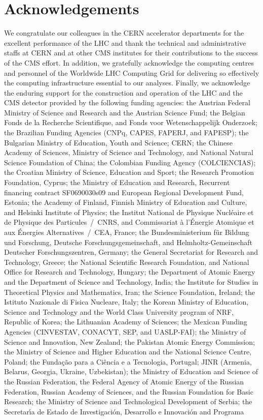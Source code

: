 \documentclass[12pt,twoside,a4paper,cmspaper,final,collab]{cms-tdr}
\begin{document}
\section*{Acknowledgements}
 We congratulate our colleagues in the CERN accelerator departments for the excellent performance of the LHC and thank the technical and administrative staffs at CERN and at other CMS institutes for their contributions to the success of the CMS effort. In addition, we gratefully acknowledge the computing centres and personnel of the Worldwide LHC Computing Grid for delivering so effectively the computing infrastructure essential to our analyses. Finally, we acknowledge the enduring support for the construction and operation of the LHC and the CMS detector provided by the following funding agencies: the Austrian Federal Ministry of Science and Research and the Austrian Science Fund; the Belgian Fonds de la Recherche Scientifique, and Fonds voor Wetenschappelijk Onderzoek; the Brazilian Funding Agencies (CNPq, CAPES, FAPERJ, and FAPESP); the Bulgarian Ministry of Education, Youth and Science; CERN; the Chinese Academy of Sciences, Ministry of Science and Technology, and National Natural Science Foundation of China; the Colombian Funding Agency (COLCIENCIAS); the Croatian Ministry of Science, Education and Sport; the Research Promotion Foundation, Cyprus; the Ministry of Education and Research, Recurrent financing contract SF0690030s09 and European Regional Development Fund, Estonia; the Academy of Finland, Finnish Ministry of Education and Culture, and Helsinki Institute of Physics; the Institut National de Physique Nucl\'eaire et de Physique des Particules~/~CNRS, and Commissariat \`a l'\'Energie Atomique et aux \'Energies Alternatives~/~CEA, France; the Bundesministerium f\"ur Bildung und Forschung, Deutsche Forschungsgemeinschaft, and Helmholtz-Gemeinschaft Deutscher Forschungszentren, Germany; the General Secretariat for Research and Technology, Greece; the National Scientific Research Foundation, and National Office for Research and Technology, Hungary; the Department of Atomic Energy and the Department of Science and Technology, India; the Institute for Studies in Theoretical Physics and Mathematics, Iran; the Science Foundation, Ireland; the Istituto Nazionale di Fisica Nucleare, Italy; the Korean Ministry of Education, Science and Technology and the World Class University program of NRF, Republic of Korea; the Lithuanian Academy of Sciences; the Mexican Funding Agencies (CINVESTAV, CONACYT, SEP, and UASLP-FAI); the Ministry of Science and Innovation, New Zealand; the Pakistan Atomic Energy Commission; the Ministry of Science and Higher Education and the National Science Centre, Poland; the Funda\c{c}\~ao para a Ci\^encia e a Tecnologia, Portugal; JINR (Armenia, Belarus, Georgia, Ukraine, Uzbekistan); the Ministry of Education and Science of the Russian Federation, the Federal Agency of Atomic Energy of the Russian Federation, Russian Academy of Sciences, and the Russian Foundation for Basic Research; the Ministry of Science and Technological Development of Serbia; the Secretar\'{\i}a de Estado de Investigaci\'on, Desarrollo e Innovaci\'on and Programa 
\end{document}
